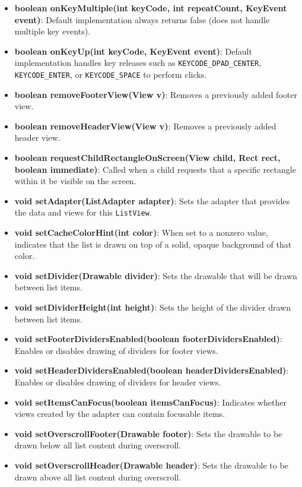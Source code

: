 \documentclass{report}
\begin{document}
\begin{itemize}
\begin{itemize}
                \item \textbf{boolean onKeyMultiple(int keyCode, int repeatCount, KeyEvent event)}: Default implementation always returns false (does not handle multiple key events).
                \item \textbf{boolean onKeyUp(int keyCode, KeyEvent event)}: Default implementation handles key releases such as \texttt{KEYCODE\_DPAD\_CENTER}, \texttt{KEYCODE\_ENTER}, or \texttt{KEYCODE\_SPACE} to perform clicks.
                \item \textbf{boolean removeFooterView(View v)}: Removes a previously added footer view.
                \item \textbf{boolean removeHeaderView(View v)}: Removes a previously added header view.
                \item \textbf{boolean requestChildRectangleOnScreen(View child, Rect rect, boolean immediate)}: Called when a child requests that a specific rectangle within it be visible on the screen.
                \item \textbf{void setAdapter(ListAdapter adapter)}: Sets the adapter that provides the data and views for this \texttt{ListView}.
                \item \textbf{void setCacheColorHint(int color)}: When set to a nonzero value, indicates that the list is drawn on top of a solid, opaque background of that color.
                \item \textbf{void setDivider(Drawable divider)}: Sets the drawable that will be drawn between list items.
                \item \textbf{void setDividerHeight(int height)}: Sets the height of the divider drawn between list items.
                \item \textbf{void setFooterDividersEnabled(boolean footerDividersEnabled)}: Enables or disables drawing of dividers for footer views.
                \item \textbf{void setHeaderDividersEnabled(boolean headerDividersEnabled)}: Enables or disables drawing of dividers for header views.
                \item \textbf{void setItemsCanFocus(boolean itemsCanFocus)}: Indicates whether views created by the adapter can contain focusable items.
                \item \textbf{void setOverscrollFooter(Drawable footer)}: Sets the drawable to be drawn below all list content during overscroll.
                \item \textbf{void setOverscrollHeader(Drawable header)}: Sets the drawable to be drawn above all list content during overscroll.

\end{itemize}
\end{itemize}
\end{document}
